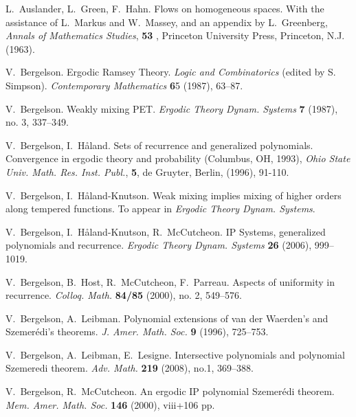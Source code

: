 \documentclass[11pt]{amsart}
\theoremstyle{plain}
\theoremstyle{definition}
\theoremstyle{remark}
\begin{document}
\begin{thebibliography}{9999}
 L.~Auslander, L.~Green, F.~Hahn. Flows on
  homogeneous spaces.  With the assistance of L.~Markus and W.~Massey,
  and an appendix by L.~Greenberg, {\it Annals of Mathematics
    Studies}, \textbf{53} , Princeton University Press, Princeton, N.J.
  (1963).


 V.~Bergelson. Ergodic Ramsey Theory. {\it Logic and
    Combinatorics} (edited by S. Simpson). {\it Contemporary
    Mathematics} {\textbf 65} (1987), 63--87.

 V.~Bergelson. Weakly mixing PET. {\em Ergodic Theory
    Dynam. Systems} {\textbf 7} (1987), no. 3,  337--349.


 V.~Bergelson, I.~H\aa{}land. Sets of recurrence and
  generalized polynomials.  Convergence in ergodic theory and
  probability (Columbus, OH, 1993), {\it Ohio State Univ. Math. Res.
    Inst. Publ.}, \textbf{5}, de Gruyter, Berlin, (1996), 91-110.

 V.~Bergelson, I.~H{\aa}land-Knutson. Weak mixing implies mixing of higher orders along tempered functions. To appear in {\em Ergodic
    Theory Dynam. Systems}.

 V.~Bergelson, I.~H\aa land-Knutson, R.~McCutcheon.
  IP Systems, generalized polynomials and recurrence. {\em Ergodic
    Theory Dynam. Systems} {\bf 26} (2006), 999--1019.


 V.~Bergelson, B.~Host, R.~McCutcheon,
  F.~Parreau. Aspects of uniformity in recurrence. {\em Colloq.
    Math.} \textbf{84/85} (2000), no. 2, 549--576.

 V.~Bergelson, A.~Leibman. Polynomial extensions of
  van der Waerden's and Szemer\'edi's theorems.  {\it J. Amer. Math.
    Soc.} \textbf{9} (1996), 725--753.

 V.~Bergelson, A.~Leibman, E.~Lesigne.
  Intersective polynomials and polynomial Szemeredi theorem. {\it Adv. Math.} \textbf{219} (2008), no.1,
   369--388.

 V.~Bergelson, R.~McCutcheon. An ergodic IP
  polynomial Szemer\'edi theorem. {\em Mem. Amer. Math. Soc.}
  \textbf{146} (2000), viii+106 pp.


\end{thebibliography}
\end{document}
